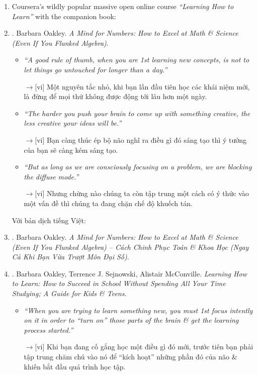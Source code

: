 \documentclass[12pt,twoside]{book}
\begin{document}
\begin{enumerate}
	\item {\sc Coursera}'s wildly popular massive open online course {\it``Learning How to Learn''} with the companion book:	
	\item \cite{Oakley_mind_number}. {\sc Barbara Oakley}. {\it A Mind for Numbers: How to Excel at Math \& Science (Even If You Flunked Algebra)}.
	\begin{itemize}
		\item {\it``A good rule of thumb, when you are 1st learning new concepts, is not to let things go untouched for longer than a day.''}
		
		{\sf[en]$\to$[vi]} Một nguyên tắc nhỏ, khi bạn lần đầu tiên học các khái niệm mới, là đừng để mọi thứ không được động tới lâu hơn một ngày.
		
		\item {\it``The harder you push your brain to come up with something creative, the less creative your ideas will be.''}
		
		{\sf[en]$\to$[vi]} Bạn càng thúc ép bộ não nghĩ ra điều gì đó sáng tạo thì ý tưởng của bạn sẽ càng kém sáng tạo.
		
		\item {\it``But as long as we are consciously focusing on a problem, we are blocking the diffuse mode.''}
		
		{\sf[en]$\to$[vi]} Nhưng chừng nào chúng ta còn tập trung một cách có ý thức vào một vấn đề thì chúng ta đang chặn chế độ khuếch tán.
	\end{itemize}
	Với bản dịch tiếng Việt:
	\item \cite{Oakley_mind_number_VN}. {\sc Barbara Oakley}. {\it A Mind for Numbers: How to Excel at Math \& Science (Even If You Flunked Algebra) -- Cách Chinh Phục Toán \& Khoa Học (Ngay Cả Khi Bạn Vừa Trượt Môn Đại Số)}.
	\item \cite{Oakley_Sejnowski_McConville_learn_how_learn}. {\sc Barbara Oakley, Terrence J. Sejnowski, Alistair McConville}. {\it Learning How to Learn: How to Succeed in School Without Spending All Your Time Studying; A Guide for Kids \& Teens}.
	\begin{itemize}
		\item {\it``When you are trying to learn something new, you must 1st focus intently on it in order to ``turn on'' those parts of the brain \& get the learning process started.''}
		
		{\sf[en]$\to$[vi]} Khi bạn đang cố gắng học một điều gì đó mới, trước tiên bạn phải tập trung chăm chú vào nó để ``kích hoạt'' những phần đó của não \& khiến bắt đầu quá trình học tập.
		

\end{itemize}
\end{enumerate}
\end{document}
